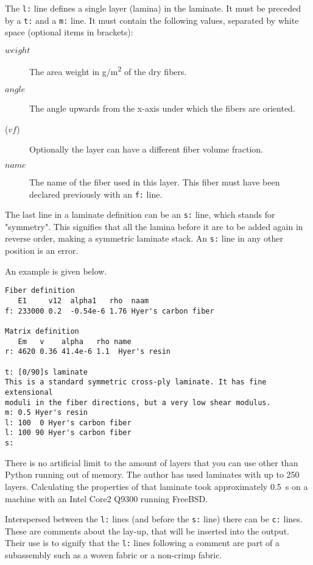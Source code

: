 \documentclass[a4paper,landscape,oneside,11pt,twocolumn]{memoir}
\begin{document}
The \texttt{l:} line defines a single layer (lamina) in the laminate. It must be
preceded by a \texttt{t:} and a \texttt{m:} line. It must contain the following values,
separated by white space (optional items in brackets):
\begin{description}
    \item[$weight$] The area weight in \si{g/m^2} of the dry fibers.
    \item[$angle$] The angle upwards from the x-axis under which the fibers are oriented.
    \item[($vf$)] Optionally the layer can have a different fiber volume fraction.
    \item[$name$] The name of the fiber used in this layer. This fiber must have been
        declared previously with an \texttt{f:} line.
\end{description}

The last line in a laminate definition can be an \texttt{s:} line, which stands
for "symmetry". This signifies that all the lamina before it are to be added
again in reverse order, making a symmetric laminate stack. An \texttt{s:} line in any
other position is an error.

An example is given below.
\begin{lstlisting}[style=plain]
Fiber definition
   E1     v12  alpha1   rho  naam
f: 233000 0.2  -0.54e-6 1.76 Hyer's carbon fiber

Matrix definition
   Em   v    alpha   rho name
r: 4620 0.36 41.4e-6 1.1  Hyer's resin

t: [0/90]s laminate
This is a standard symmetric cross-ply laminate. It has fine extensional
moduli in the fiber directions, but a very low shear modulus.
m: 0.5 Hyer's resin
l: 100  0 Hyer's carbon fiber
l: 100 90 Hyer's carbon fiber
s:
\end{lstlisting}

There is no artificial limit to the amount of layers that you can use other
than Python running out of memory. The author has used laminates with up to
250 layers. Calculating the properties of that laminate took approximately
\SI{0.5}{s} on a machine with an Intel Core2 Q9300 running FreeBSD.

Interspersed between the \texttt{l:} lines (and before the \texttt{s:} line)
there can be \texttt{c:} lines.
These are comments about the lay-up, that will be inserted into the output.
Their use is to signify that the \texttt{l:} lines following a comment are
part of a subassembly such as a woven fabric or a non-crimp fabric.
\end{document}
